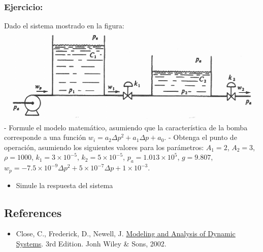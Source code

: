 \documentclass[11pt]{article}
\makeatletter
\def\maxwidth{\ifdim\Gin@nat@width>\linewidth\linewidth
    \else\Gin@nat@width\fi}
\let\Oldincludegraphics\includegraphics
\renewcommand{\includegraphics}[1]{\Oldincludegraphics[width=.8\maxwidth]{#1}}
\providecommand{\tightlist}{%
      \setlength{\itemsep}{0pt}\setlength{\parskip}{0pt}}
\makeatother
\begin{document}
    \subsubsection{Ejercicio:}\label{ejercicio}

Dado el sistema mostrado en la figura:
\includegraphics{img/pump_2tanks_2valves.png} - Formule el modelo
matemático, asumiendo que la característica de la bomba corresponde a
una función \(w_i = a_2 \Delta p^2 + a_1 \Delta p + a_0\). - Obtenga el
punto de operación, asumiendo los siguientes valores para los
parámetros: \(A_1=2\), \(A_2=3\), \(\rho=1000\),
\(k_1 = 3 \times 10^{-5}\), \(k_2 = 5 \times 10^{-5}\),
\(p_a = 1.013 \times 10^{5}\), \(g = 9.807\),
\(w_p = -7.5 \times 10^{-9} \Delta p^2 + 5 \times 10^{-7} \Delta p + 1 \times 10^{-3}\).

\begin{itemize}
\tightlist
\item
  Simule la respuesta del sistema
\end{itemize}

    \subsection{References}\label{references}

\begin{itemize}
\tightlist
\item
  Close, C., Frederick, D., Newell, J.
  \href{https://books.google.com.co/books?isbn=0471452963}{Modeling and
  Analysis of Dynamic Systems}. 3rd Edition. Jonh Wiley \& Sons, 2002.
\end{itemize}


    
    
    
    
\end{document}
